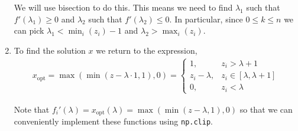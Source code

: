 \documentclass[10pt]{article}
\begin{document}
\begin{solution}[Solution]
\begin{enumerate}[label=(\alph*)]
        We will use bisection to do this. This means we need to find \( \lambda_1 \) such that \( f'(\lambda_1) \geq 0 \) and \( \lambda_2 \) such that \( f'(\lambda_2) \leq 0 \). In particular, since \( 0\leq k\leq n \) we can pick \( \lambda_1 < \min_i(z_i)-1 \) and \( \lambda_2 > \max_i(z_i) \).

    \item To find the solution \( x \) we return to the expression,
        \begin{align*}
             x_{\text{opt}} = \max(\min(z-\lambda\cdot 1,1),0)
            = \begin{cases}
                1, & z_i> \lambda+1 \\
                z_i - \lambda, & z_i \in[\lambda,\lambda+1] \\
                0, & z_i< \lambda
            \end{cases}
        \end{align*}

        Note that \( f_i'(\lambda) = x_\text{opt}(\lambda) = \max(\min(z-\lambda,1),0) \) so that we can conveniently implement these functions using {\tt np.clip}.
        
\end{enumerate}

\end{solution}
\end{document}

